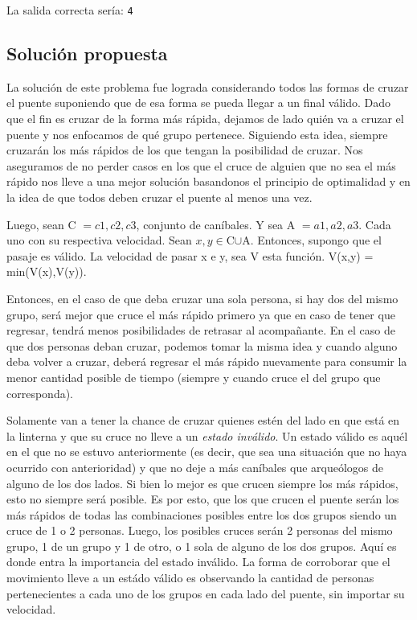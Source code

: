         La salida correcta sería: \newline
        \texttt{4}

    \subsection{Solución propuesta}
        La solución de este problema fue lograda considerando todos las formas de cruzar el puente suponiendo que de esa forma se pueda llegar a un final válido. Dado que el fin es cruzar de la forma más rápida, dejamos de lado quién va a cruzar el puente y nos enfocamos de qué grupo pertenece. Siguiendo esta idea, siempre cruzarán los más rápidos de los que tengan la posibilidad de cruzar. Nos aseguramos de no perder casos en los que el cruce de alguien que no sea el más rápido nos lleve a una mejor solución basandonos el principio de optimalidad y en la idea de que todos deben cruzar el puente al menos una vez.

        Luego, sean C $={c1,c2,c3}$, conjunto de caníbales. Y sea A $={a1,a2,a3}$. Cada uno con su respectiva velocidad.
        Sean $x,y\in$C$\cup$A. Entonces, supongo que el pasaje es válido.
        La velocidad de pasar x e y, sea V esta función. V(x,y) = min(V(x),V(y)). 

        
        Entonces, en el caso de que deba cruzar una sola persona, si hay dos del mismo grupo, será mejor que cruce el más rápido primero ya que en caso de tener que regresar, tendrá menos posibilidades de retrasar al acompañante. En el caso de que dos personas deban cruzar, podemos tomar la misma idea y cuando alguno deba volver a cruzar, deberá regresar el más rápido nuevamente para consumir la menor cantidad posible de tiempo (siempre y cuando cruce el del grupo que corresponda).

        Solamente van a tener la chance de cruzar quienes estén del lado en que está en la linterna y que su cruce no lleve a un \emph{estado inválido}. Un estado válido es aquél en el que no se estuvo anteriormente (es decir, que sea una situación que no haya ocurrido con anterioridad) y que no deje a más caníbales que arqueólogos de alguno de los dos lados. Si bien lo mejor es que crucen siempre los más rápidos, esto no siempre será posible. Es por esto, que los que crucen el puente serán los más rápidos de todas las combinaciones posibles entre los dos grupos siendo un cruce de 1 o 2 personas. Luego, los posibles cruces serán 2 personas del mismo grupo, 1 de un grupo y 1 de otro, o 1 sola de alguno de los dos grupos. Aquí es donde entra la importancia del estado inválido. La forma de corroborar que el movimiento lleve a un estádo válido es observando la cantidad de personas pertenecientes a cada uno de los grupos en cada lado del puente, sin importar su velocidad.

